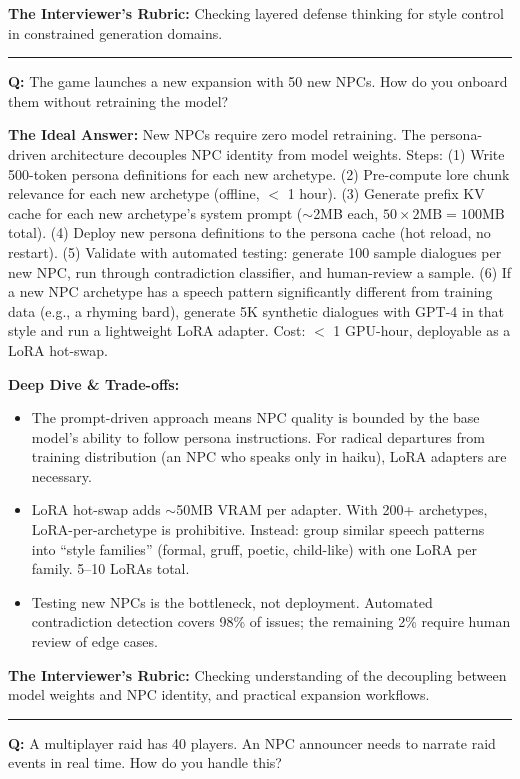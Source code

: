 \textbf{The Interviewer's Rubric:} Checking layered defense thinking for style control in constrained generation domains.

\bigskip\hrule\bigskip

\textbf{Q:} The game launches a new expansion with 50 new NPCs. How do you onboard them without retraining the model?

\textbf{The Ideal Answer:} New NPCs require zero model retraining. The persona-driven architecture decouples NPC identity from model weights. Steps: (1) Write 500-token persona definitions for each new archetype. (2) Pre-compute lore chunk relevance for each new archetype (offline, $<$ 1 hour). (3) Generate prefix KV cache for each new archetype's system prompt ($\sim$2MB each, $50 \times 2\text{MB} = 100\text{MB}$ total). (4) Deploy new persona definitions to the persona cache (hot reload, no restart). (5) Validate with automated testing: generate 100 sample dialogues per new NPC, run through contradiction classifier, and human-review a sample. (6) If a new NPC archetype has a speech pattern significantly different from training data (e.g., a rhyming bard), generate 5K synthetic dialogues with GPT-4 in that style and run a lightweight LoRA adapter. Cost: $<$ 1 GPU-hour, deployable as a LoRA hot-swap.

\textbf{Deep Dive \& Trade-offs:}
\begin{itemize}
  \item The prompt-driven approach means NPC quality is bounded by the base model's ability to follow persona instructions. For radical departures from training distribution (an NPC who speaks only in haiku), LoRA adapters are necessary.
  \item LoRA hot-swap adds $\sim$50MB VRAM per adapter. With 200+ archetypes, LoRA-per-archetype is prohibitive. Instead: group similar speech patterns into ``style families'' (formal, gruff, poetic, child-like) with one LoRA per family. 5--10 LoRAs total.
  \item Testing new NPCs is the bottleneck, not deployment. Automated contradiction detection covers 98\% of issues; the remaining 2\% require human review of edge cases.
\end{itemize}

\textbf{The Interviewer's Rubric:} Checking understanding of the decoupling between model weights and NPC identity, and practical expansion workflows.

\bigskip\hrule\bigskip

\textbf{Q:} A multiplayer raid has 40 players. An NPC announcer needs to narrate raid events in real time. How do you handle this?


